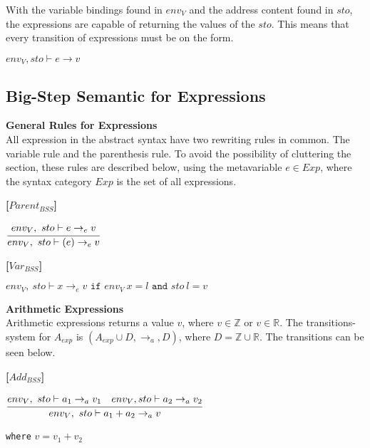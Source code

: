 With the variable bindings found in $env_V$ and the address content found in $sto$, the expressions are capable of returning the values of the $sto$.
This means that every transition of expressions must be on the form.
\begin{center}
	$env_V,sto \vdash e \rightarrow v$
\end{center} 

\subsection{Big-Step Semantic for Expressions}

\textbf{\large{General Rules for Expressions}} \\
All expression in the abstract syntax have two rewriting rules in common.
The variable rule and the parenthesis rule.
To avoid the possibility of cluttering the section, these rules are described below, using the metavariable $e \in Exp$, where the syntax category $Exp$ is the set of all expressions.

\textbf{[$Parent_{BSS}$]}
\begin{center}
	\begin{math}
	\cfrac
		{env_V,\ sto \vdash e \rightarrow_e v}
		{env_V,\ sto \vdash (e) \rightarrow_e v}
	\end{math}
\end{center}

\textbf{[$Var_{BSS}$]}
\begin{center}
	\begin{math}
	env_V,\ sto \vdash x \rightarrow_e v
	\texttt{ if } env_V\ x = l
	\texttt{ and } sto\ l = v
	\end{math}
\end{center}

\textbf{\large{Arithmetic Expressions}}\\
Arithmetic expressions returns a value $v$, where $v \in \mathbb{Z}$ or $v \in \mathbb{R}$.
The transitions-system for $A_{exp}$ is $(A_{exp} \cup D, \rightarrow_a, D)$, 
where $D = \mathbb{Z} \cup \mathbb{R}$.
The transitions can be seen below.

\textbf{[$Add_{BSS}$]}\\
\begin{center}
	\begin{math}
	\cfrac
		{env_V,\ sto \vdash a_1 \rightarrow_a v_1 \quad env_V, sto \vdash a_2 \rightarrow_a v_2}
		{env_V,\ sto \vdash a_1 + a_2 \rightarrow_a v}
	\end{math}
	
	
	\texttt{where} $v = v_1 + v_2$
\end{center}

